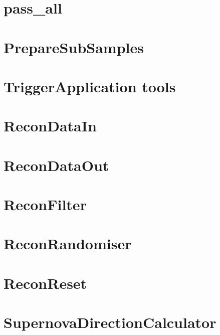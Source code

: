 \documentclass[twoside]{book}
\begin{document}
\chapter{pass\-\_\-all}
\label{md_UserTools_pass_all_README}
\hypertarget{md_UserTools_pass_all_README}{}

\chapter{Prepare\-Sub\-Samples}
\label{md_UserTools_PrepareSubSamples_README}
\hypertarget{md_UserTools_PrepareSubSamples_README}{}

\chapter{Trigger\-Application tools}
\label{md_UserTools_README}
\hypertarget{md_UserTools_README}{}

\chapter{Recon\-Data\-In}
\label{md_UserTools_ReconDataIn_README}
\hypertarget{md_UserTools_ReconDataIn_README}{}

\chapter{Recon\-Data\-Out}
\label{md_UserTools_ReconDataOut_README}
\hypertarget{md_UserTools_ReconDataOut_README}{}

\chapter{Recon\-Filter}
\label{md_UserTools_ReconFilter_README}
\hypertarget{md_UserTools_ReconFilter_README}{}

\chapter{Recon\-Randomiser}
\label{md_UserTools_ReconRandomiser_README}
\hypertarget{md_UserTools_ReconRandomiser_README}{}

\chapter{Recon\-Reset}
\label{md_UserTools_ReconReset_README}
\hypertarget{md_UserTools_ReconReset_README}{}

\chapter{Supernova\-Direction\-Calculator}
\label{md_UserTools_SupernovaDirectionCalculator_README}
\hypertarget{md_UserTools_SupernovaDirectionCalculator_README}{}

\end{document}
